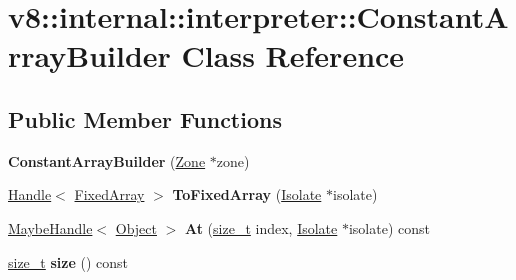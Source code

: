 \hypertarget{classv8_1_1internal_1_1interpreter_1_1ConstantArrayBuilder}{}\section{v8\+:\+:internal\+:\+:interpreter\+:\+:Constant\+Array\+Builder Class Reference}
\label{classv8_1_1internal_1_1interpreter_1_1ConstantArrayBuilder}
\subsection*{Public Member Functions}
\begin{DoxyCompactItemize}
\item 
\mbox{\label{classv8_1_1internal_1_1interpreter_1_1ConstantArrayBuilder_a6371038963d35f5030bf3458fe04edfd}} 
{\bfseries Constant\+Array\+Builder} (\mbox{\hyperlink{classv8_1_1internal_1_1Zone}{Zone}} $\ast$zone)
\item 
\mbox{\label{classv8_1_1internal_1_1interpreter_1_1ConstantArrayBuilder_a39db2f4fff66f145f4157faa88a3826a}} 
\mbox{\hyperlink{classv8_1_1internal_1_1Handle}{Handle}}$<$ \mbox{\hyperlink{classv8_1_1internal_1_1FixedArray}{Fixed\+Array}} $>$ {\bfseries To\+Fixed\+Array} (\mbox{\hyperlink{classv8_1_1internal_1_1Isolate}{Isolate}} $\ast$isolate)
\item 
\mbox{\label{classv8_1_1internal_1_1interpreter_1_1ConstantArrayBuilder_a9ef9f82b4bcd6aa3c392a61695c2ba69}} 
\mbox{\hyperlink{classv8_1_1internal_1_1MaybeHandle}{Maybe\+Handle}}$<$ \mbox{\hyperlink{classv8_1_1internal_1_1Object}{Object}} $>$ {\bfseries At} (\mbox{\hyperlink{classsize__t}{size\+\_\+t}} index, \mbox{\hyperlink{classv8_1_1internal_1_1Isolate}{Isolate}} $\ast$isolate) const
\item 
\mbox{\label{classv8_1_1internal_1_1interpreter_1_1ConstantArrayBuilder_a0620f41346bea747d9465251e4c40b0f}} 
\mbox{\hyperlink{classsize__t}{size\+\_\+t}} {\bfseries size} () const
\item 
\mbox{\label{classv8_1_1internal_1_1interpreter_1_1ConstantArrayBuilder_a78e063845c21f838199ea0eb2cb0ae23}} 

\end{DoxyCompactItemize}
